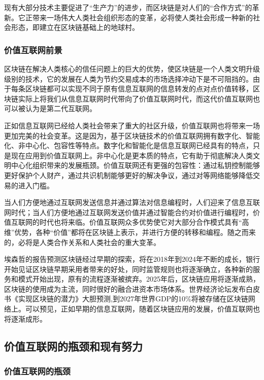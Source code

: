 \documentclass[a4paper,12pt]{article}
\begin{document}
现有大部分技术主要促进了“生产力”的进步，而区块链是对人们的“合作方式”的革新。它正带来一场伟大人类社会组织形态的变革，必将使人类社会形成一种新的社会形态，即建立在区块链基础上的地球村。

\subsubsection{价值互联网前景}

区块链在解决人类核心的信任问题上的巨大的优势，使区块链是一个人类文明升级级别的技术，它的发展在人类为节约交易成本的市场选择冲动下是不可阻挡的。由于每条区块链都可以实现不同于原有信息互联网的信息转发的点对点价值转移，区块链实际上将我们从信息互联网时代带向了价值互联网时代，而这代价值互联网也可以被认为是第二代互联网。

正如信息互联网已经给人类社会带来了重大的社区升级，价值互联网也将带来一场更加完美的社会变革。这是因为，基于区块链技术的价值互联网拥有数字化、智能化、非中心化、包容性等特点。数字化和智能化是信息互联网已经具有的特点，只是现在应用到价值互联网上。非中心化是更本质的特点，它有助于彻底解决人类文明中心化组织带来的发展瓶颈。价值互联网还有更强的包容性：通过私钥控制能够更好保护个人财产，通过共识机制能够更好的解决争议，通过对等网络能够降低交易的进入门槛。

当人们方便地通过互联网发送信息并通过算法对信息编程时，人们迎来了信息互联网时代；当人们方便地通过互联网发送价值并通过智能合约对价值进行编程时，价值互联网的时代也将来临。价值互联网众多优势使它对大部分合作模式具有“高维”优势，各种“价值”都将在区块链上表示，并进行方便的转移和编程。随之而来的，必将是人类合作关系和人类社会的重大变革。

埃森哲的报告\citeyearpar{Accenture}预测区块链经过早期的探索，将在2018年到2024年不断的成长，银行开始见证区块链早期采用者带来的好处，同时监管规则也将逐渐确立，各种新的服务和模式开始出现，原有的流程逐渐被摈弃。2025年后，区块链应用将逐渐成熟，区块链的使用成为主流，同时很好的融合进资本市场体系。世界经济论坛发布白皮书《实现区块链的潜力》\citeyearpar{Worldeconomyforum}大胆预测,到2027年世界GDP的10\%将被存储在区块链网络上。可以预见，正如早期的信息互联网，随着区块链应用的发展，价值互联网也将逐渐成形。

\subsection{价值互联网的瓶颈和现有努力}

\subsubsection{价值互联网的瓶颈}
\end{document}
